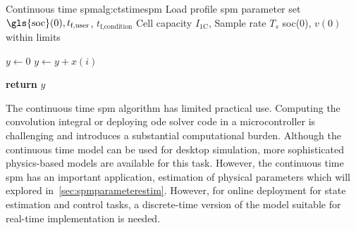 \begin{center}
    \begin{customalgo}[0.9\textwidth]{Continuous time \gls{spm}}{alg:ctstimespm}
        \Require Load profile 
        \Require \gls{spm} parameter set  
        \Userdata $\text{\gls{soc}}(0), t_\text{f,user}$, $t_\text{f,condition}$ 
        \Userdata Cell capacity $I_\text{1C}$, Sample rate $T_s$
        \Ensure \gls{soc}(0), $v(0)$ within limits
        \State {}

        \State $y\gets0$
         
        \State $y\gets y+x(i)$ 
        \EndFor

        \State \textbf{return}  $y$
        \EndProcedure
    \end{customalgo}
\end{center}

The continuous time \gls{spm} algorithm has limited practical use. Computing the
convolution integral or deploying \gls{ode}  solver code in a microcontroller is
challenging  and introduces  a  substantial computational  burden. Although  the
continuous time  model can  be used for  desktop simulation,  more sophisticated
physics-based  models  are available  for  this  task. However,  the  continuous
time  \gls{spm} has  an  important application,  \viz{}  estimation of  physical
parameters  which will  explored  in~\cref{sec:spmparameterestim}. However,  for
online  deployment  for state  estimation  and  control tasks,  a  discrete-time
version of the model suitable for real-time implementation is needed.

